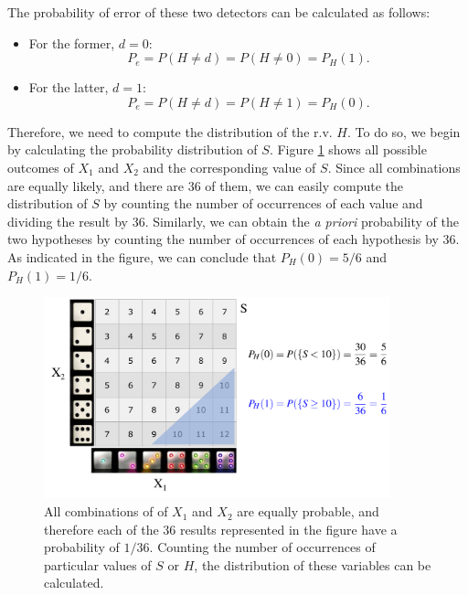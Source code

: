 \begin{solution}
\begin{itemize}
    The probability of error of these two detectors can be calculated as follows:
    \begin{itemize}
        \item For the former, $d=0$:
        $$P_e = P(H\neq d) = P(H \neq 0) = P_H(1).$$
        \item For the latter, $d=1$:
        $$P_e = P(H\neq d) = P(H \neq 1) = P_H(0).$$
    \end{itemize}

    Therefore, we need to compute the distribution of the r.v. $H$. To do so, we begin by calculating the probability distribution of $S$. Figure \ref{fig:dice} shows all possible outcomes of $X_1$ and $X_2$ and the corresponding value of $S$. Since all combinations are equally likely, and there are $36$ of them, we can easily compute the distribution of $S$ by counting the number of occurrences of each value and dividing the result by $36$. Similarly, we can obtain the {\em a priori} probability of the two hypotheses by counting the number of occurrences of each hypothesis by 36. As indicated in the figure, we can conclude that $P_H(0) = 5/6$ and $P_H(1) = 1/6$.
    
    \begin{figure}
        \begin{center}
            \includegraphics[width=10cm]{Figures/Dice.png}
        \end{center}
        \caption{All combinations of of $X_1$ and $X_2$ are equally probable, and therefore each of the $36$ results represented in the figure have a probability of $1/36$. Counting the number of occurrences of particular values of $S$ or $H$, the distribution of these variables can be calculated.\label{fig:dice}}
    \end{figure}
    

\end{itemize}
\end{solution}
